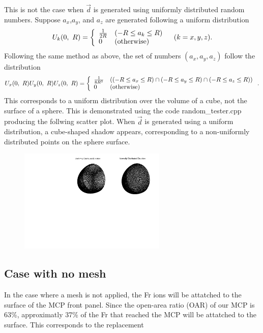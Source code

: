 \documentclass{article}
\begin{document}
This is not the case when $\vec{d}$ is generated using uniformly distributed random numbers. Suppose $a_x$,$a_y$, and $a_z$ are generated following a uniform distribution
$$
U_k(0,\ R) = \left\{
\begin{array}{ll}
	\frac{1}{2R} & (-R \le a_k \le R) \\
	0 & ({\rm otherwise})
\end{array} \right. \, \, \, \, \, (k = x, y, z).
$$
Following the same method as above, the set of numbers $(a_x, a_y, a_z)$ follow the distribution
$$
U_x(0,\ R) U_y(0,\ R) U_z(0,\ R) = \left\{
\begin{array}{ll}
	\frac{1}{8R^3} & \left( (-R \le a_x \le R) \cap (-R \le a_y \le R) \cap (-R \le a_z \le R) \right) \\
	0 & ({\rm otherwise})
\end{array} \right. .
$$
This corresponds to a uniform distribution over the volume of a cube, not the surface of a sphere. This is demonstrated using the code random\_tester.cpp producing the follwing scatter plot. When $\vec{d}$ is generated using a uniform distribution, a cube-shaped shadow appears, corresponding to a non-uniformly distributed points on the sphere surface.

\begin{figure}[H]
  \begin{center}
    \includegraphics[width=7.0cm,angle=-90]{./random_tester.pdf}
  \end{center}
\end{figure}




\subsection{Case with no mesh}
In the case where a mesh is not applied, the Fr ions will be attatched to the surface of the MCP front panel. Since the open-area ratio (OAR) of our MCP is 63\%, approximatly 37\% of the Fr that reached the MCP will be attatched to the surface. This corresponds to the replacement
\end{document}
